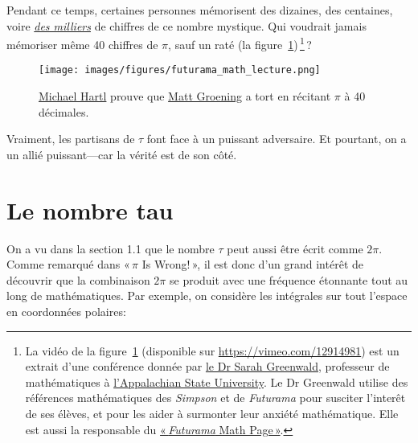 Pendant ce temps, certaines personnes mémorisent des dizaines, des centaines, voire \href{https://www.guinnessworldrecords.com/world-records/most-pi-places-memorised}{\emph{des milliers}} de chiffres de ce nombre mystique. Qui voudrait jamais mémoriser même 40 chiffres de $\pi$, sauf un raté (la figure~\ref{fig:futurama_video})\,\footnote{La vidéo de la figure~\ref{fig:futurama_video} (disponible sur \url{https://vimeo.com/12914981}) est un extrait d'une conférence donnée par \href{https://cs.appstate.edu/~sjg/}{le Dr Sarah Greenwald}, professeur de mathématiques à \href{https://www.appstate.edu/}{l'Appalachian State University}. Le Dr Greenwald utilise des références mathématiques des \emph{Simpson} et de \emph{Futurama} pour susciter l'interêt de ses élèves, et pour les aider à surmonter leur anxiété mathématique. Elle est aussi la responsable du \href{https://cs.appstate.edu/~sjg/futurama/}{«\,\emph{Futurama} Math Page\,»}.}\,?

\begin{figure}
\begin{center}
\texttt{[image: images/figures/futurama\_math\_lecture.png]} %
\end{center}
\caption{\href{https://tauday.com/tau-manifesto/\#sec-about_the_author}{Michael Hartl} prouve que \href{https://fr.wikipedia.org/wiki/Matt_Groening}{Matt Groening} a tort en récitant $\pi$ à 40 décimales.\label{fig:futurama_video}}
\end{figure}

Vraiment, les partisans de $\tau$ font face à un puissant adversaire. Et pourtant, on a un allié puissant---car la vérité est de son côté.


\section{Le nombre tau} %
\label{sec:the_number_tau}

On a vu dans la section 1.1 que le nombre $\tau$ peut aussi être écrit comme $2\pi$. Comme remarqué dans «\,$\pi$ Is Wrong!\,», il est donc d'un grand intérêt de découvrir que la combinaison $2\pi$ se produit avec une fréquence étonnante tout au long de mathématiques. Par exemple, on considère les intégrales sur tout l'espace en coordonnées polaires:

